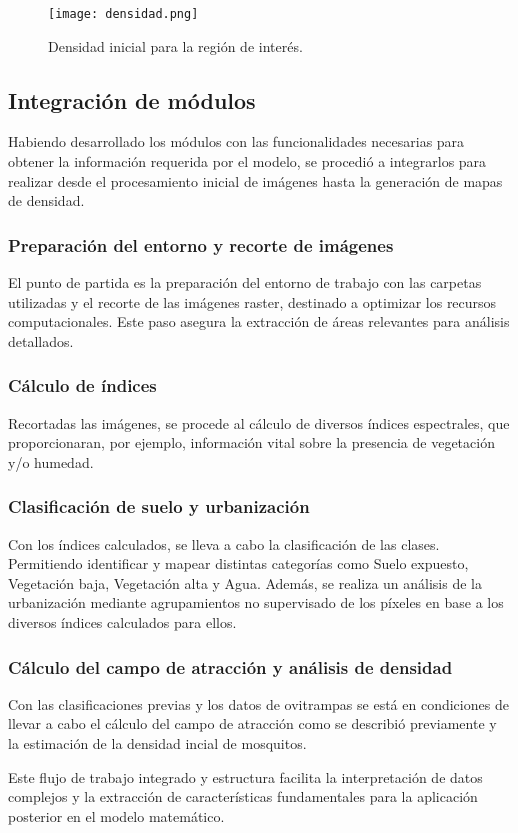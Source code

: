\begin{figure}[H]
	\texttt{[image: densidad.png]}
	\centering
	\caption{Densidad inicial para la región de interés.}
	\label{fig:densidad}
\end{figure}


\subsection{Integración de módulos}

Habiendo desarrollado los módulos con las funcionalidades necesarias para obtener la información requerida por el modelo, se procedió a integrarlos para realizar desde el procesamiento inicial de imágenes hasta la generación de mapas de densidad.

\subsubsection{Preparación del entorno y recorte de imágenes}

El punto de partida es la preparación del entorno de trabajo con las carpetas utilizadas y el recorte de las imágenes raster, destinado a optimizar los recursos computacionales. Este paso asegura la extracción de áreas relevantes para análisis detallados.

\subsubsection{Cálculo de índices}

Recortadas las imágenes, se procede al cálculo de diversos índices espectrales, que proporcionaran, por ejemplo, información vital sobre la presencia de vegetación y/o humedad.

\subsubsection{Clasificación de suelo y urbanización}

Con los índices calculados, se lleva a cabo la clasificación de las clases. Permitiendo identificar y mapear distintas categorías como Suelo expuesto, Vegetación baja, Vegetación alta y Agua. Además, se realiza un análisis de la urbanización mediante agrupamientos no supervisado de los píxeles en base a los diversos índices calculados para ellos.

\subsubsection{Cálculo del campo de atracción y análisis de densidad}

Con las clasificaciones previas y los datos de ovitrampas se está en condiciones de llevar a cabo el cálculo del campo de atracción como se describió previamente y la estimación de la densidad incial de mosquitos. 

Este flujo de trabajo integrado y estructura facilita la interpretación de datos complejos y la extracción de características fundamentales para la aplicación posterior en el modelo matemático.